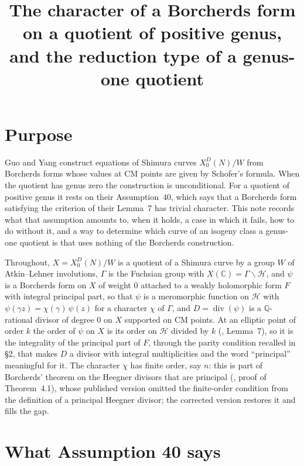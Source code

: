 \documentclass[11pt,reqno]{amsart}
\title{The character of a Borcherds form on a quotient of positive genus,\\ and the reduction type of a genus-one quotient}
\author{}
\date{}
\theoremstyle{plain}
\theoremstyle{definition}
\DeclareMathOperator{\divisor}{div}
\newcommand{\Q}{\mathbb{Q}}
\newcommand{\C}{\mathbb{C}}
\newcommand{\HH}{\mathcal{H}}
\begin{document}
\maketitle

\section{Purpose}

Guo and Yang \cite{GY} construct equations of Shimura curves $X_0^D(N)/W$ from Borcherds
forms whose values at CM points are given by Schofer's formula. When the quotient has genus
zero the construction is unconditional. For a quotient of positive genus it rests on their
Assumption~40, which says that a Borcherds form satisfying the criterion of their Lemma~7 has
trivial character. This note records what that assumption amounts to, when it holds, a case in
which it fails, how to do without it, and a way to determine which curve of an isogeny class a
genus-one quotient is that uses nothing of the Borcherds construction.

Throughout, $X = X_0^D(N)/W$ is a quotient of a Shimura curve by a group $W$ of Atkin--Lehner
involutions, $\Gamma$ is the Fuchsian group with $X(\C) = \Gamma\backslash\HH$, and $\psi$ is a
Borcherds form on $X$ of weight $0$ attached to a weakly holomorphic form $F$ with integral
principal part, so that $\psi$ is a meromorphic function on $\HH$ with
$\psi(\gamma z) = \chi(\gamma)\,\psi(z)$ for a character $\chi$ of $\Gamma$, and
$D = \divisor(\psi)$ is a $\Q$-rational divisor of degree $0$ on $X$ supported on CM points. At an
elliptic point of order $k$ the order of $\psi$ on $X$ is its order on $\HH$ divided by $k$
(\cite{GY}, Lemma~7), so it is the integrality of the principal part of $F$, through the parity
condition recalled in \S2, that makes $D$ a divisor with integral multiplicities and the word
``principal'' meaningful for it. The character $\chi$ has finite order, say $n$: this is part of
Borcherds' theorem on the Heegner divisors that are principal (\cite{Bo}, proof of Theorem~4.1),
whose published version omitted the finite-order condition from the definition of a principal
Heegner divisor; the corrected version \cite{BoCorr} restores it and fills the gap.

\section{What Assumption 40 says}
\end{document}
